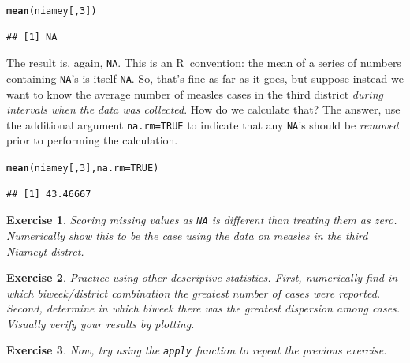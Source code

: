 \documentclass{article}\usepackage[]{graphicx}\usepackage[]{color}
\makeatletter
\newcommand{\hlnum}[1]{\textcolor[rgb]{0.686,0.059,0.569}{#1}}%
\newcommand{\hlstd}[1]{\textcolor[rgb]{0.345,0.345,0.345}{#1}}%
\newcommand{\hlkwc}[1]{\textcolor[rgb]{0.333,0.667,0.333}{#1}}%
\newcommand{\hlkwd}[1]{\textcolor[rgb]{0.737,0.353,0.396}{\textbf{#1}}}%
\newenvironment{kframe}{%
 \def\at@end@of@kframe{}%
 \ifinner\ifhmode%
  \def\at@end@of@kframe{\end{minipage}}%
  \begin{minipage}{\columnwidth}%
 \fi\fi%
 \def\FrameCommand##1{\hskip\@totalleftmargin \hskip-\fboxsep
 \colorbox{shadecolor}{##1}\hskip-\fboxsep
     \hskip-\linewidth \hskip-\@totalleftmargin \hskip\columnwidth}%
 \MakeFramed {\advance\hsize-\width
   \@totalleftmargin\z@ \linewidth\hsize
   \@setminipage}}%
 {\par\unskip\endMakeFramed%
 \at@end@of@kframe}
\newenvironment{knitrout}{}{} %
\newcommand{\R}{\textsf{R}}
\newcommand{\code}[1]{\texttt{#1}}
\theoremstyle{exercise}
\newtheorem{exercise}{Exercise}
\makeatother
\begin{document}
\begin{knitrout}
\color{fgcolor}\begin{kframe}
\begin{alltt}
\hlkwd{mean}\hlstd{(niamey[,}\hlnum{3}\hlstd{])}
\end{alltt}
\begin{verbatim}
## [1] NA
\end{verbatim}
\end{kframe}
\end{knitrout}

The result is, again, \code{NA}. This is an \R\ convention: the mean of a series of numbers containing \code{NA}'s is itself \code{NA}. So, that's fine as far as it goes, but suppose instead we want to know the average number of measles cases in the third district \textit{during intervals when the data was collected}. How do we calculate that? The answer, use the additional argument \code{na.rm=TRUE} to indicate that any \code{NA}'s should be \textit{removed} prior to performing the calculation.

\begin{knitrout}
\color{fgcolor}\begin{kframe}
\begin{alltt}
\hlkwd{mean}\hlstd{(niamey[,}\hlnum{3}\hlstd{],} \hlkwc{na.rm}\hlstd{=}\hlnum{TRUE}\hlstd{)}
\end{alltt}
\begin{verbatim}
## [1] 43.46667
\end{verbatim}
\end{kframe}
\end{knitrout}

\begin{exercise}
Scoring missing values as \code{NA} is different than treating them as zero. Numerically show this to be the case using the data on measles in the third Niameyt distrct.
\end{exercise}

\begin{exercise}
Practice using other descriptive statistics. First, numerically find in which biweek/district combination the greatest number of cases were reported. Second, determine in which biweek there was the greatest dispersion among cases. Visually verify your results by plotting. 
\end{exercise}

\begin{exercise}
Now, try using the \code{apply} function to repeat the previous exercise. 
\end{exercise}
\end{document}
